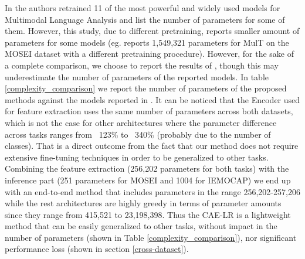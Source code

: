 In \cite{gkoumas2021makes} the authors retrained 11 of the most powerful and widely used models for Multimodal Language Analysis and list the number of parameters for some of them. However, this study, due to different pretraining, reports smaller amount of parameters for some models (eg. \cite{mai2021analyzing} reports 1,549,321 parameters for MulT on the MOSEI dataset with a different pretraining procedure). However, for the sake of a complete comparison, we choose to report the results of \cite{gkoumas2021makes}, though this may underestimate the number of parameters of the reported models. In table \ref{complexity_comparison} we report the number of parameters of the proposed methods against the models reported in \cite{gkoumas2021makes}. It can be noticed that the Encoder used for feature extraction uses the same number of parameters across both datasets, which is not the case for other architectures where the parameter difference across tasks ranges from ~123\% to ~340\% (probably due to the number of classes). That is a direct outcome from the fact that our method does not require extensive fine-tuning techniques in order to be generalized to other tasks. Combining the feature extraction (256,202 parameters for both tasks) with the inference part (251 parameters for MOSEI and 1004 for IEMOCAP) we end up with an end-to-end method that includes parameters in the range 256,202-257,206 while the rest architectures are highly greedy in terms of parameter amounts since they range from 415,521 to 23,198,398. Thus the CAE-LR is a lightweight method that can be easily generalized to other tasks, without impact in the number of parameters (shown in Table \ref{complexity_comparison}), nor significant performance loss (shown in section \ref{cross-dataset}).